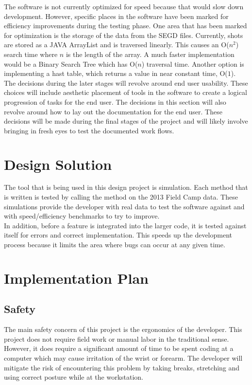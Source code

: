 \documentclass[11pt]{article}
\begin{document}
The software is not currently optimized for speed because that would slow down development. However, specific places in the software have been marked for efficiency improvements during the testing phase. One area that has been marked for optimization is the storage of the data from the SEGD files. Currently, shots are stored as a JAVA ArrayList and is traversed linearly. This causes an O($n^2$) search time where $n$ is the length of the array. A much faster implementation would be a Binary Search Tree which has O($n$) traversal time. Another option is implementing a hast table, which returns a value in near constant time, O($1$). \\

The decisions during the later stages will revolve around end user usability. These choices will include aesthetic placement of tools in the software to create a logical progression of tasks for the end user. The decisions in this section will also revolve around how to lay out the documentation for the end user. These decisions will be made during the final stages of the project and will likely involve bringing in fresh eyes to test the documented work flows. \\

\section{Design Solution}

The tool that is being used in this design project is simulation. Each method that is written is tested by calling the method on the 2013 Field Camp data. These simulations provide the developer with real data to test the software against and with speed/efficiency benchmarks to try to improve. \\

In addition, before a feature is integrated into the larger code, it is tested against itself for errors and correct implementation. This speeds up the development process because it limits the area where bugs can occur at any given time.

\section{Implementation Plan}
\subsection{Safety}

The main safety concern of this project is the ergonomics of the developer. This project does not require field work or manual labor in the traditional sense. However, it does require a significant amount of time to be spent coding at a computer which may cause irritation of the wrist or forearm. The developer will mitigate the risk of encountering this problem by taking breaks, stretching and using correct posture while at the workstation.
\end{document}
